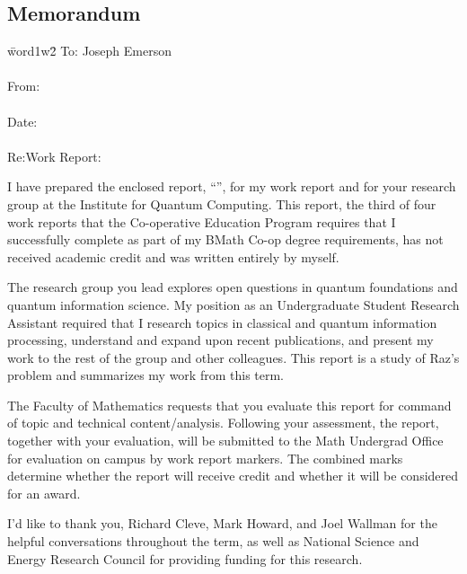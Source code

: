 \documentclass[../3Wworkreport.tex]{subfiles}
\begin{document}

\begin{memorandum}
\makeatletter
\section*{Memorandum}
\begin{tabbing}
	\=word1w2\=\kill
	To: \>\>Joseph Emerson \\\\
	From:\>\>\@author \\\\
	Date:\>\>\@date \\\\
	Re:\>\>Work Report: \@title\\
\end{tabbing}

I have prepared the enclosed report, ``\@title'', for my \term work report and for your research group at the Institute for Quantum Computing. This report, the third of four work reports that the Co-operative Education Program requires that I successfully complete as part of my BMath Co-op degree requirements, has not received academic credit and was written entirely by myself. 

The research group you lead explores open questions in quantum foundations and quantum information science. My position as an Undergraduate Student Research Assistant required that I research topics in classical and quantum information processing, understand and expand upon recent publications, and present my work to the rest of the group and other colleagues. This report is a study of Raz's problem and summarizes my work from this term.

The Faculty of Mathematics requests that you evaluate this report for command of topic and technical content/analysis. Following your assessment, the report, together with your evaluation, will be submitted to the Math Undergrad Office for evaluation on campus by work report markers. The combined marks determine whether the report will receive credit and whether it will be considered for an award.

I'd like to thank you, Richard Cleve, Mark Howard, and Joel Wallman for the helpful conversations throughout the term, as well as National Science and Energy Research Council for providing funding for this research.\\

\@author
\makeatother
\newpage
\end{memorandum}
\end{document}
